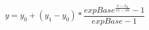 \documentclass{article}
\begin{document}
\[ y = y_0 + (y_1-y_0) * \frac{expBase^{\frac{x-x_0}{x1-x0}}-1}{expBase-1} \]
\end{document}
